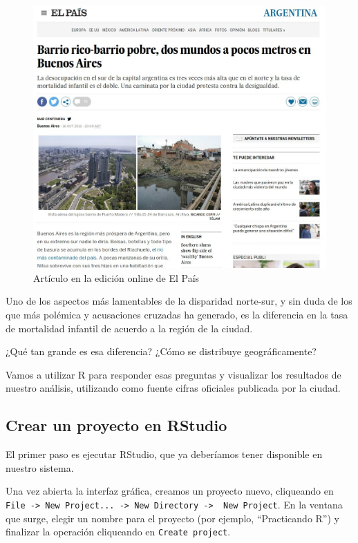 \documentclass[
]{book}
\begin{document}
\begin{figure}
\includegraphics[width=1\linewidth]{imagenes/noticia_caba} \caption{Artículo en la edición online de El País}\label{fig:unnamed-chunk-6}
\end{figure}

Uno de los aspectos más lamentables de la disparidad norte-sur, y sin duda de los que más polémica y acusaciones cruzadas ha generado, es la diferencia en la tasa de mortalidad infantil de acuerdo a la región de la ciudad.

¿Qué tan grande es esa diferencia? ¿Cómo se distribuye geográficamente?

Vamos a utilizar R para responder esas preguntas y visualizar los resultados de nuestro análisis, utilizando como fuente cifras oficiales publicada por la ciudad.

\hypertarget{crear-un-proyecto-en-rstudio}{%
\subsection{Crear un proyecto en RStudio}\label{crear-un-proyecto-en-rstudio}}

El primer paso es ejecutar RStudio, que ya deberíamos tener disponible en nuestro sistema.

Una vez abierta la interfaz gráfica, creamos un proyecto nuevo, cliqueando en \texttt{File\ -\textgreater{}\ New\ Project...\ -\textgreater{}\ New\ Directory\ -\textgreater{}\ \ New\ Project}. En la ventana que surge, elegir un nombre para el proyecto (por ejemplo, ``Practicando R'') y finalizar la operación cliqueando en \texttt{Create\ project}.
\end{document}
